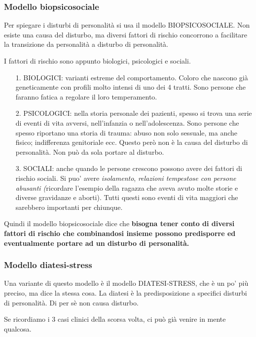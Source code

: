 \subsubsection{Modello biopsicosociale}

Per spiegare i disturbi di personalità si usa il modello
BIOPSICOSOCIALE. Non esiste una causa del disturbo, ma diversi fattori
di rischio concorrono a facilitare la transizione da personalità a
disturbo di personalità.

I fattori di rischio sono appunto biologici, psicologici e sociali.

\begin{itemize}
\item[1.]
  BIOLOGICI: varianti estreme del comportamento. Coloro che nascono già
  geneticamente con profili molto intensi di uno dei 4 tratti. Sono
  persone che faranno fatica a regolare il loro temperamento.
\item[2.]
  PSICOLOGICI: nella storia personale dei pazienti, spesso si trova una
  serie di eventi di vita avversi, nell'infanzia o nell'adolescenza.
  Sono persone che spesso riportano una storia di trauma: abuso non solo
  sessuale, ma anche fisico; indifferenza genitoriale ecc. Questo però
  non è la causa del disturbo di personalità. Non può da sola portare al
  disturbo.
\item[3.]
  SOCIALI: anche quando le persone crescono possono avere dei fattori di
  rischio sociali. Si puo' avere \emph{isolamento}, \emph{relazioni
  tempestose con persone abusanti (}ricordare l'esempio della ragazza
  che aveva avuto molte storie e diverse gravidanze e aborti). Tutti
  questi sono eventi di vita maggiori che sarebbero importanti per
  chiunque.
\end{itemize}

Quindi il modello biopsicosociale dice che \textbf{bisogna tener conto
di diversi fattori di rischio che combinandosi insieme possono
predisporre ed eventualmente portare ad un disturbo di personalità.}

\subsubsection{Modello diatesi-stress}

Una variante di questo modello è il modello DIATESI-STRESS, che è un po'
più preciso, ma dice la stessa cosa. La diatesi è la predisposizione a
specifici disturbi di personalità. Di per sè non causa disturbo.

Se ricordiamo i 3 casi clinici della scorsa volta, ci può già venire in
mente qualcosa.

